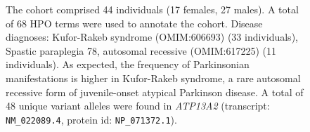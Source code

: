 \begin{figure}[htbp]
\vspace{2em}

\caption{The cohort comprised 44 individuals (17 females, 27 males). A total of 68 HPO terms were used to annotate the cohort. 
Disease diagnoses: Kufor-Rakeb syndrome (OMIM:606693) (33 individuals), Spastic paraplegia 78, autosomal recessive (OMIM:617225) 
(11 individuals). As expected, the frequency of Parkinsonian manifestations is higher in Kufor-Rakeb syndrome,
 a rare autosomal recessive form of juvenile-onset atypical Parkinson disease. A total of 48 unique variant alleles were found in \textit{ATP13A2} (transcript: \texttt{NM\_022089.4}, protein id: \texttt{NP\_071372.1}).}
\end{figure}
